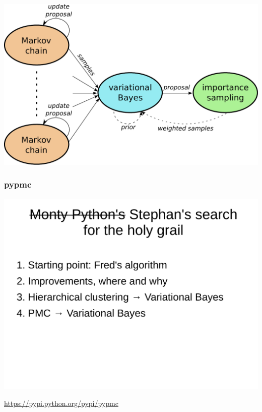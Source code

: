 \documentclass[english]{beamer}
\newcommand{\slide}[2][t]{\begin{frame}[#1] \frametitle{\insertsection} #2 \end{frame}}
\begin{document}
\slide[c]{

    \includegraphics[width=\textwidth]{figures/algorithm}

}

\slide{

    \frametitle{{\selectfont pypmc}}

    \vspace{3mm}

    \includegraphics[width=\textwidth,page=6, trim= 0 0 0 5cm, clip]{../presentation_22_april/presentation}



    \begin{center}
        \url{https://pypi.python.org/pypi/pypmc}
    \end{center}

}
\end{document}
